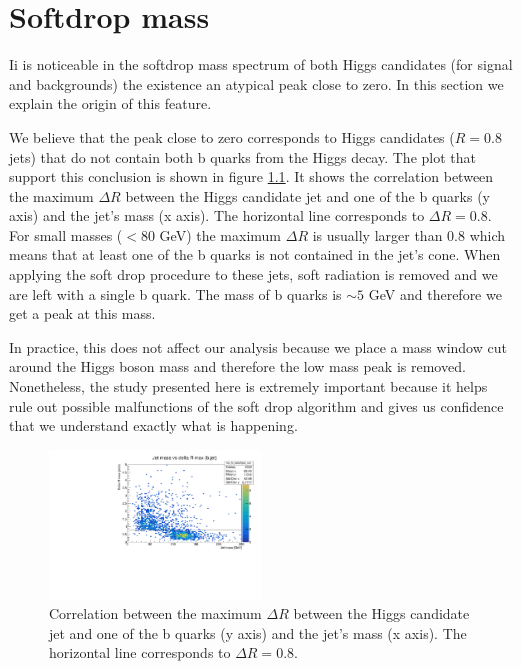 
\chapter{Softdrop mass}
\label{chapter:SDmass}

Ii is noticeable in the softdrop mass spectrum of both Higgs candidates (for signal and backgrounds) the existence an atypical peak close to zero. In this section we explain the origin of this feature.

We believe that the peak close to zero corresponds to Higgs candidates ($R=0.8$ jets) that do not contain both b quarks from the Higgs decay. The plot that support this conclusion is shown in figure \ref{fig:SDmass_peak}. It shows the correlation between the maximum $\Delta R$ between the Higgs candidate jet and one of the b quarks (y axis) and the jet's mass (x axis). The horizontal line corresponds to $\Delta R=0.8$. For small masses ($<80$ GeV) the maximum $\Delta R$ is usually larger than $0.8$ which means that at least one of the b quarks is not contained in the jet's cone. When applying the soft drop procedure to these jets, soft radiation is removed and we are left with a single b quark. The mass of b quarks is $\sim5$ GeV and therefore we get a peak at this mass.

In practice, this does not affect our analysis because we place a mass window cut around the Higgs boson mass and therefore the low mass peak is removed. Nonetheless, the study presented here is extremely important because it helps rule out possible malfunctions of the soft drop algorithm and gives us confidence that we understand exactly what is happening. 

\begin{figure}
	\centering
	\includegraphics[width=0.5\textwidth]{./Figures/hist_M_deltaRmax_jetb_corr.pdf}
	\caption{Correlation between the maximum $\Delta R$ between the Higgs candidate jet and one of the b quarks (y axis) and the jet's mass (x axis). The horizontal line corresponds to $\Delta R=0.8$.}
	\label{fig:SDmass_peak}
\end{figure}
